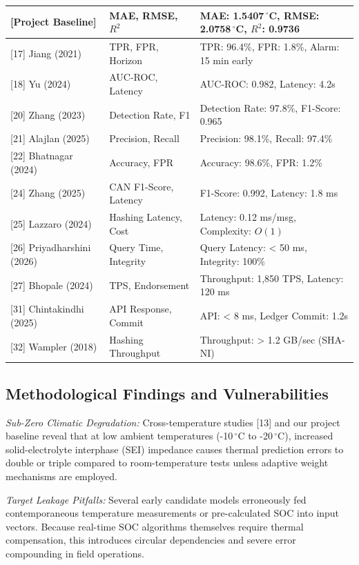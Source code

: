 \documentclass[conference]{IEEEtran}
\begin{document}
\begin{table}[htbp]
\begin{tabular}{@{}lll@{}}
{[Project Baseline]} & MAE, RMSE, $R^2$ & MAE: 1.5407\,$^\circ$C, RMSE: 2.0758\,$^\circ$C, $R^2$: 0.9736 \\ \midrule
{[17] Jiang (2021)} & TPR, FPR, Horizon & TPR: 96.4\%, FPR: 1.8\%, Alarm: 15 min early \\
{[18] Yu (2024)} & AUC-ROC, Latency & AUC-ROC: 0.982, Latency: 4.2s \\
{[20] Zhang (2023)} & Detection Rate, F1 & Detection Rate: 97.8\%, F1-Score: 0.965 \\
{[21] Alajlan (2025)} & Precision, Recall & Precision: 98.1\%, Recall: 97.4\% \\
{[22] Bhatnagar (2024)} & Accuracy, FPR & Accuracy: 98.6\%, FPR: 1.2\% \\
{[24] Zhang (2025)} & CAN F1-Score, Latency & F1-Score: 0.992, Latency: 1.8 ms \\
{[25] Lazzaro (2024)} & Hashing Latency, Cost & Latency: 0.12 ms/msg, Complexity: $O(1)$ \\
{[26] Priyadharshini (2026)} & Query Time, Integrity & Query Latency: < 50 ms, Integrity: 100\% \\
{[27] Bhopale (2024)} & TPS, Endorsement & Throughput: 1,850 TPS, Latency: 120 ms \\
{[31] Chintakindhi (2025)} & API Response, Commit & API: < 8 ms, Ledger Commit: 1.2s \\
{[32] Wampler (2018)} & Hashing Throughput & Throughput: > 1.2 GB/sec (SHA-NI) \\ \bottomrule
\end{tabular}
\end{table}

\subsection{Methodological Findings and Vulnerabilities}
\textit{Sub-Zero Climatic Degradation:} Cross-temperature studies [13] and our project baseline reveal that at low ambient temperatures (-10\,$^\circ$C to -20\,$^\circ$C), increased solid-electrolyte interphase (SEI) impedance causes thermal prediction errors to double or triple compared to room-temperature tests unless adaptive weight mechanisms are employed.

\textit{Target Leakage Pitfalls:} Several early candidate models erroneously fed contemporaneous temperature measurements or pre-calculated SOC into input vectors. Because real-time SOC algorithms themselves require thermal compensation, this introduces circular dependencies and severe error compounding in field operations.
\end{document}
